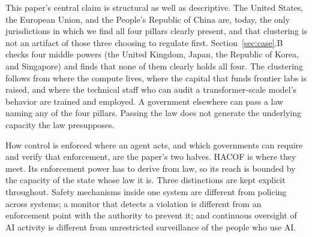 \documentclass[journal]{IEEEtran}
\newcommand{\hacof}{HACOF}
\begin{document}
This paper's central claim is structural as well as descriptive. The United States, the European Union, and the People's Republic of China are, today, the only jurisdictions in which we find all four pillars clearly present, and that clustering is not an artifact of those three choosing to regulate first. Section~\ref{sec:case}.B checks four middle powers (the United Kingdom, Japan, the Republic of Korea, and Singapore) and finds that none of them clearly holds all four. The clustering follows from where the compute lives, where the capital that funds frontier labs is raised, and where the technical staff who can audit a transformer-scale model's behavior are trained and employed. A government elsewhere can pass a law naming any of the four pillars. Passing the law does not generate the underlying capacity the law presupposes.

How control is enforced where an agent acts, and which governments can require and verify that enforcement, are the paper's two halves. \hacof{} is where they meet. Its enforcement power has to derive from law, so its reach is bounded by the capacity of the state whose law it is. Three distinctions are kept explicit throughout. Safety mechanisms inside one system are different from policing across systems; a monitor that detects a violation is different from an enforcement point with the authority to prevent it; and continuous oversight of AI activity is different from unrestricted surveillance of the people who use AI.
\end{document}
